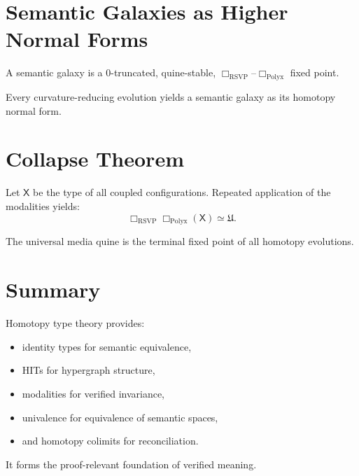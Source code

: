 \section{Semantic Galaxies as Higher Normal Forms}

\begin{definition}
A semantic galaxy is a 0-truncated, quine-stable, $\Box_{\mathrm{RSVP}}$–$\Box_{\mathrm{Polyx}}$ fixed point.
\end{definition}

\begin{proposition}
Every curvature-reducing evolution yields a semantic galaxy as its homotopy normal form.
\end{proposition}

\section{Collapse Theorem}

\begin{theorem}
Let $\mathsf{X}$ be the type of all coupled configurations.  
Repeated application of the modalities yields:
\[
\Box_{\mathrm{RSVP}}\Box_{\mathrm{Polyx}}(\mathsf{X})
  \simeq \mathfrak{U}.
\]
\end{theorem}

\begin{corollary}
The universal media quine is the terminal fixed point of all homotopy evolutions.
\end{corollary}

\section{Summary}

Homotopy type theory provides:
\begin{itemize}
\item identity types for semantic equivalence,
\item HITs for hypergraph structure,
\item modalities for verified invariance,
\item univalence for equivalence of semantic spaces,
\item and homotopy colimits for reconciliation.
\end{itemize}

It forms the proof-relevant foundation of verified meaning.


